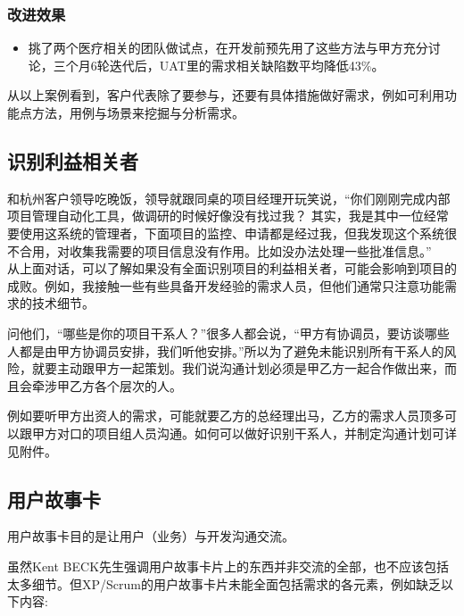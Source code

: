 \hypertarget{ux6539ux8fdbux6548ux679c}{%
\subsubsection{改进效果}\label{ux6539ux8fdbux6548ux679c}}

\begin{itemize}
\tightlist
\item
  挑了两个医疗相关的团队做试点，在开发前预先用了这些方法与甲方充分讨论，三个月6轮迭代后，UAT里的需求相关缺陷数平均降低43\%。
\end{itemize}

从以上案例看到，客户代表除了要参与，还要有具体措施做好需求，例如可利用功能点方法，用例与场景来挖掘与分析需求。

\hypertarget{ux8bc6ux522bux5229ux76caux76f8ux5173ux8005}{%
\subsection{识别利益相关者}\label{ux8bc6ux522bux5229ux76caux76f8ux5173ux8005}}

和杭州客户领导吃晚饭，领导就跟同桌的项目经理开玩笑说，``你们刚刚完成内部项目管理自动化工具，做调研的时候好像没有找过我？
其实，我是其中一位经常要使用这系统的管理者，下面项目的监控、申请都是经过我，但我发现这个系统很不合用，对收集我需要的项目信息没有作用。比如没办法处理一些批准信息。''\\
从上面对话，可以了解如果没有全面识别项目的利益相关者，可能会影响到项目的成败。例如，我接触一些有些具备开发经验的需求人员，但他们通常只注意功能需求的技术细节。

问他们，``哪些是你的项目干系人？''很多人都会说，``甲方有协调员，要访谈哪些人都是由甲方协调员安排，我们听他安排。''所以为了避免未能识别所有干系人的风险，就要主动跟甲方一起策划。我们说沟通计划必须是甲乙方一起合作做出来，而且会牵涉甲乙方各个层次的人。

例如要听甲方出资人的需求，可能就要乙方的总经理出马，乙方的需求人员顶多可以跟甲方对口的项目组人员沟通。如何可以做好识别干系人，并制定沟通计划可详见附件。

\hypertarget{ux7528ux6237ux6545ux4e8bux5361}{%
\subsection{用户故事卡}\label{ux7528ux6237ux6545ux4e8bux5361}}

用户故事卡目的是让用户（业务）与开发沟通交流。

虽然Kent
BECK先生强调用户故事卡片上的东西并非交流的全部，也不应该包括太多细节。但XP/Scrum的用户故事卡片未能全面包括需求的各元素，例如缺乏以下内容:

